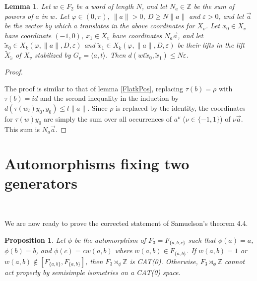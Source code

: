 \documentclass  [a4paper, 11pts] {article}
\newtheorem{pro}[thm]{Proposition}
\newtheorem{lem}[thm]{Lemma}
\newcommand{\Z}{\mathbb{Z}}
\newcommand{\eps}{\varepsilon}
\begin{document}
\begin{lem}
\label{Flatk0}
    Let $w\in F_2$ be a word of length $N$, and let $N_a\in \Z$ be the sum of powers of $a$ in $w$. Let $\varphi\in (0, \pi)$, $\|a\| > 0$, $D \ge N\|a\|$ and $\eps > 0$, and let $\vec{a}$ be the vector by which $a$ translates in the above coordinates for $X_v$. Let $x_0\in X_v$ have coordinate $(-1, 0)$, $x_1\in X_v$ have coordinates $N_a\vec{a}$, and let $\tilde{x}_0\in X_k(\varphi, \|a\|, D, \eps)$ and $\tilde{x}_1\in X_k(\varphi, \|a\|, D, \eps)$ be their lifts in the lift $\tilde{X}_{\tilde{v}}$ of $X_v$ stabilized by $G_v=\langle a, t\rangle$. Then $d(wt\tilde{x}_0, \tilde{x}_1) \le N\eps$.
\end{lem}

\begin{proof} ~

The proof is similar to that of lemma \ref{FlatkPos}, replacing $\tau(b) = \rho$ with $\tau(b) = id$ and the second inequality in the induction by $d(\tau(w_l)y_0, y_0) \le l\|a\|$. Since $\rho$ is replaced by the identity, the coordinates for $\tau(w)y_0$ are simply the sum over all occurrences of $a^\nu$ ($\nu\in \{-1, 1\}$) of $\nu\vec{a}$. This sum is $N_a\vec{a}$.

\end{proof}

\section{Automorphisms fixing two generators} ~
\label{F2}

We are now ready to prove the corrected statement of Samuelson's theorem 4.4.

\begin{pro}
\label{InvF2}
    Let $\phi$ be the automorphism of $F_3 = F_{\{a, b, c\}}$ such that $\phi(a)=a$, $\phi(b)=b$, and $\phi(c)=cw(a, b)$ where $w(a, b)\in F_{\{a, b\}}$. If $w(a, b)=1$ or $w(a, b)\notin [F_{\{a,b\}}, F_{\{a,b\}}]$, then $F_3\rtimes_\phi\Z$ is CAT(0). Otherwise, $F_3\rtimes_\phi\Z$ cannot act properly by semisimple isometries on a CAT(0) space.
\end{pro}
\end{document}
